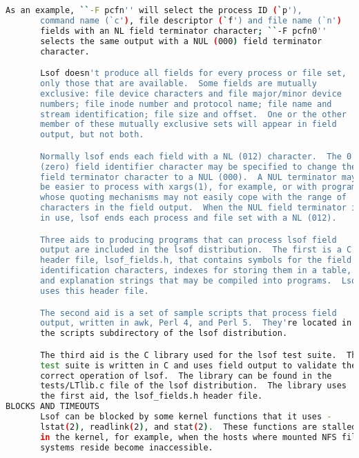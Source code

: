 {{\begin{lstlisting}[language=bash]
       As an example, ``-F pcfn'' will select the process ID (`p'),
       command name (`c'), file descriptor (`f') and file name (`n')
       fields with an NL field terminator character; ``-F pcfn0''
       selects the same output with a NUL (000) field terminator
       character.

       Lsof doesn't produce all fields for every process or file set,
       only those that are available.  Some fields are mutually
       exclusive: file device characters and file major/minor device
       numbers; file inode number and protocol name; file name and
       stream identification; file size and offset.  One or the other
       member of these mutually exclusive sets will appear in field
       output, but not both.

       Normally lsof ends each field with a NL (012) character.  The 0
       (zero) field identifier character may be specified to change the
       field terminator character to a NUL (000).  A NUL terminator may
       be easier to process with xargs(1), for example, or with programs
       whose quoting mechanisms may not easily cope with the range of
       characters in the field output.  When the NUL field terminator is
       in use, lsof ends each process and file set with a NL (012).

       Three aids to producing programs that can process lsof field
       output are included in the lsof distribution.  The first is a C
       header file, lsof_fields.h, that contains symbols for the field
       identification characters, indexes for storing them in a table,
       and explanation strings that may be compiled into programs.  Lsof
       uses this header file.

       The second aid is a set of sample scripts that process field
       output, written in awk, Perl 4, and Perl 5.  They're located in
       the scripts subdirectory of the lsof distribution.

       The third aid is the C library used for the lsof test suite.  The
       test suite is written in C and uses field output to validate the
       correct operation of lsof.  The library can be found in the
       tests/LTlib.c file of the lsof distribution.  The library uses
       the first aid, the lsof_fields.h header file.
BLOCKS AND TIMEOUTS
       Lsof can be blocked by some kernel functions that it uses -
       lstat(2), readlink(2), and stat(2).  These functions are stalled
       in the kernel, for example, when the hosts where mounted NFS file
       systems reside become inaccessible.


\end{lstlisting}}}
